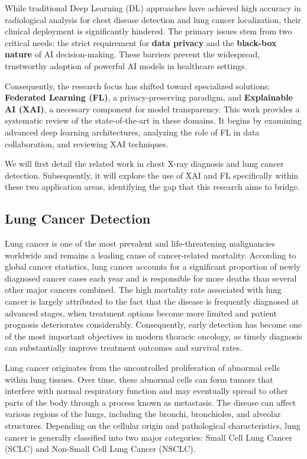 While traditional Deep Learning (DL) approaches have achieved high accuracy in radiological analysis for chest disease detection and lung cancer  localization, their clinical deployment is significantly hindered. The primary issues stem from two critical needs: the strict requirement for \textbf{data privacy} and the \textbf{black-box nature} of AI decision-making. These barriers prevent the widespread, trustworthy adoption of powerful AI models in healthcare settings.

Consequently, the research focus has shifted toward specialized solutions: \textbf{Federated Learning (FL)}, a privacy-preserving paradigm, and \textbf{Explainable AI (XAI)}, a necessary component for model transparency. This work provides a systematic review of the state-of-the-art in these domains. It begins by examining advanced deep learning architectures, analyzing the role of FL in data collaboration, and reviewing XAI techniques.

We will first detail the related work in chest X-ray diagnosis and lung cancer detection. Subsequently, it will explore the use of XAI and FL specifically within these two application areas, identifying the gap that this research aims to bridge.

\subsection{Lung Cancer Detection}
\label{subsec:lung_cancer_detection}

Lung cancer is one of the most prevalent and life-threatening malignancies worldwide and remains a leading cause of cancer-related mortality. According to global cancer statistics, lung cancer accounts for a significant proportion of newly diagnosed cancer cases each year and is responsible for more deaths than several other major cancers combined. The high mortality rate associated with lung cancer is largely attributed to the fact that the disease is frequently diagnosed at advanced stages, when treatment options become more limited and patient prognosis deteriorates considerably. Consequently, early detection has become one of the most important objectives in modern thoracic oncology, as timely diagnosis can substantially improve treatment outcomes and survival rates.

Lung cancer originates from the uncontrolled proliferation of abnormal cells within lung tissues. Over time, these abnormal cells can form tumors that interfere with normal respiratory function and may eventually spread to other parts of the body through a process known as metastasis. The disease can affect various regions of the lungs, including the bronchi, bronchioles, and alveolar structures. Depending on the cellular origin and pathological characteristics, lung cancer is generally classified into two major categories: Small Cell Lung Cancer (SCLC) and Non-Small Cell Lung Cancer (NSCLC).

